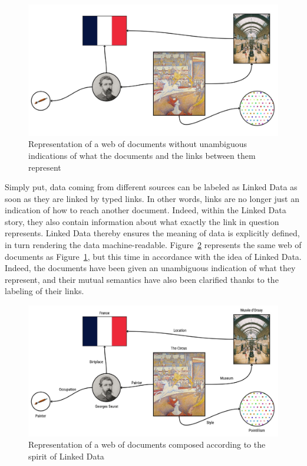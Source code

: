 \begin{figure}[htbp]
    \centering
	\includegraphics[width=\textwidth]{images/no_linked_data.jpg}
    \captionsetup{justification=centering}
	\caption{Representation of a web of documents without unambiguous indications of what the documents and the links between them represent}
	\label{fig:no_linked_data}
\end{figure}

Simply put, data coming from different sources can be labeled as Linked Data as soon as they are linked by typed links. In other words, links are no longer just an indication of how to reach another document. Indeed, within the Linked Data story, they also contain information about what exactly the link in question represents. Linked Data thereby ensures the meaning of data is explicitly defined, in turn rendering the data machine-readable. Figure~\ref{fig:linked_data} represents the same web of documents as Figure~\ref{fig:no_linked_data}, but this time in accordance with the idea of Linked Data. Indeed, the documents have been given an  unambiguous indication of what they represent, and their mutual semantics have also been clarified thanks to the labeling of their links. \citep{bizer2011linked}

\begin{figure}[htbp]
    \centering
	\includegraphics[width=\textwidth]{images/linked_data.jpg}
    \captionsetup{justification=centering}
	\caption{Representation of a web of documents composed according to the spirit of Linked Data}
	\label{fig:linked_data}
\end{figure}

